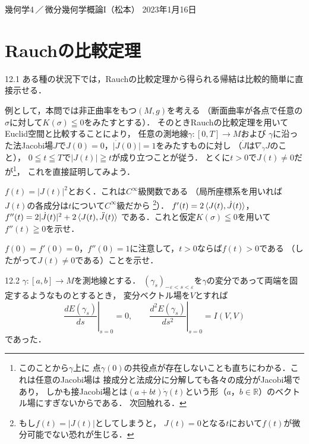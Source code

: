 \documentclass[uplatex,dvipdfmx,fontsize=12pt,jafontsize=11pt,line_length=42zw,number_of_lines=36,hanging_punctuation]{jlreq}
\newcommand{\abs}[1]{\lvert#1\rvert}
\begin{document}
\begin{flushleft}
	幾何学4\,／\,微分幾何学概論I（松本）
	\hfill
	2023年1月16日
\end{flushleft}
\setcounter{section}{11}
\section{Rauchの比較定理}

\begin{enumerate-problems}
	\item[12.1]
		ある種の状況下では，Rauchの比較定理から得られる帰結は比較的簡単に直接示せる．

		例として，本問では非正曲率をもつ$(M,g)$を考える
		（断面曲率が各点で任意の$\sigma$に対して$K(\sigma)\leqq 0$をみたすとする）．
		そのときRauchの比較定理を用いてEuclid空間と比較することにより，
		任意の測地線$\gamma\colon[0,T]\to M$および
		$\gamma$に沿った法Jacobi場$J$で$J(0)=0$，$\abs{\dot{J}(0)}=1$をみたすものに対し
		（$\dot{J}$は$\nabla_{\dot{\gamma}}J$のこと），
		$0\leqq t\leqq T$で$\abs{J(t)}\geqq t$が成り立つことが従う．
		とくに$t>0$で$J(t)\not=0$だが\footnote{このことから$\gamma$上に
		点$\gamma(0)$の共役点が存在しないことも直ちにわかる．これは任意のJacobi場は
		接成分と法成分に分解しても各々の成分がJacobi場であり，
		しかも接Jacobi場とは$(a+bt)\dot{\gamma}(t)$という形（$a$，$b\in\mathbb{R}$）のベクトル場にすぎないからである．
		次回触れる．}，
		これを直接証明してみよう．
		\begin{enumerate-subproblems}
			\item
				$f(t)=\abs{J(t)}^2$とおく．これは$C^\infty$級関数である
				（局所座標系を用いれば$J(t)$の各成分は$t$について$C^\infty$級だから
				\footnote{もし$f(t)=\abs{J(t)}$としてしまうと，
				$J(t)=0$となる$t$において$f(t)$が微分可能でない恐れが生じる．}）．
				$f'(t)=2\braket{J(t),\dot{J}(t)}$，
				$f''(t)=2\abs{\dot{J}(t)}^2+2\braket{J(t),\ddot{J}(t)}$
				である．これと仮定$K(\sigma)\leqq 0$を用いて$f''(t)\geqq 0$を示せ．
			\item
				$f(0)=f'(0)=0$，$f''(0)=1$に注意して，$t>0$ならば$f(t)>0$である
				（したがって$J(t)\not=0$である）ことを示せ．
		\end{enumerate-subproblems}
	\item[12.2]
		$\gamma\colon[a,b]\to M$を測地線とする．
		$(\gamma_s)_{-\varepsilon<s<\varepsilon}$を$\gamma$の変分であって両端を固定するようなものとするとき，
		変分ベクトル場を$V$とすれば
		\begin{equation}
			\left.\frac{dE(\gamma_s)}{ds}\right|_{s=0}=0,\qquad
			\left.\frac{d^2E(\gamma_s)}{ds^2}\right|_{s=0}=I(V,V)
		\end{equation}
		であった．


\end{enumerate-problems}
\end{document}

